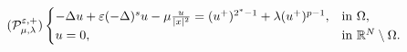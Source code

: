 \documentclass[11pt]{article}
\newtheorem{theorem}{Theorem}[section] %
\newcommand{\om} {\Omega}
\newcommand{\la} {\lambda}
\newcommand{\X}{\mathcal{X}_0} %
\begin{document}
\begin{equation}\tag{$\mathcal{P}_{\mu, \la}^{\varepsilon,+}$}
\begin{cases}
-\Delta u + \varepsilon(-\Delta)^s u - \mu \frac{u}{|x|^2} = (u^+)^{2^*-1} + \lambda (u^+)^{p-1}, & \text{in } \Omega, \\
u = 0, & \text{in } \mathbb{R}^N \setminus \Omega.
\end{cases}
\label{eq:maineq_plus_epsilon}
\end{equation}
\end{document}
